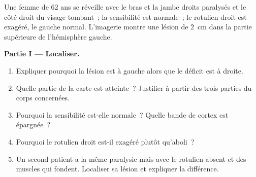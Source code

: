 \begin{problem}
\label{pb:g12:brain-and-movement:1}
Une femme de 62 ans se réveille avec le bras et la jambe droits
paralysés et le côté droit du visage tombant~; la sensibilité est
normale~; le  rotulien droit est exagéré, le gauche normal.
L'imagerie montre une lésion de \qty{2}{cm} dans la partie supérieure
de l'hémisphère gauche.

\medskip
\noindent\textbf{Partie I --- Localiser.}
\begin{enumerate}
  \item Expliquer pourquoi la lésion est à gauche alors que le déficit
        est à droite.
  \item Quelle partie de la carte est atteinte~? Justifier à partir
        des trois parties du corps concernées.
  \item Pourquoi la sensibilité est-elle normale~? Quelle bande de
        cortex est épargnée~?
  \item Pourquoi le  rotulien droit est-il exagéré plutôt
        qu'aboli~?
  \item Un second patient a la même paralysie mais avec le 
        rotulien absent et des muscles qui fondent. Localiser sa
        lésion et expliquer la différence.
\end{enumerate}


\end{problem}
